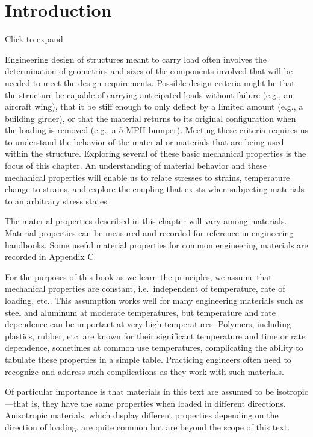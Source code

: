 \documentclass[
  letterpaper,
  DIV=11,
  numbers=noendperiod]{scrreprt}
\theoremstyle{definition}
\theoremstyle{remark}
\begin{document}
\section*{Introduction}\label{introduction-3}


Click to expand

Engineering design of structures meant to carry load often involves the
determination of geometries and sizes of the components involved that
will be needed to meet the design requirements. Possible design criteria
might be that the structure be capable of carrying anticipated loads
without failure (e.g., an aircraft wing), that it be stiff enough to
only deflect by a limited amount (e.g., a building girder), or that the
material returns to its original configuration when the loading is
removed (e.g., a 5 MPH bumper). Meeting these criteria requires us to
understand the behavior of the material or materials that are being used
within the structure. Exploring several of these basic mechanical
properties is the focus of this chapter. An understanding of material
behavior and these mechanical properties will enable us to relate
stresses to strains, temperature change to strains, and explore the
coupling that exists when subjecting materials to an arbitrary stress
states.

The material properties described in this chapter will vary among
materials. Material properties can be measured and recorded for
reference in engineering handbooks. Some useful material properties for
common engineering materials are recorded in Appendix C.

For the purposes of this book as we learn the principles, we assume that
mechanical properties are constant, i.e.~independent of temperature,
rate of loading, etc.. This assumption works well for many engineering
materials such as steel and aluminum at moderate temperatures, but
temperature and rate dependence can be important at very high
temperatures. Polymers, including plastics, rubber, etc. are known for
their significant temperature and time or rate dependence, sometimes at
common use temperatures, complicating the ability to tabulate these
properties in a simple table. Practicing engineers often need to
recognize and address such complications as they work with such
materials.

Of particular importance is that materials in this text are assumed to
be isotropic---that is, they have the same properties when loaded in
different directions. Anisotropic materials, which display different
properties depending on the direction of loading, are quite common but
are beyond the scope of this text.
\end{document}
